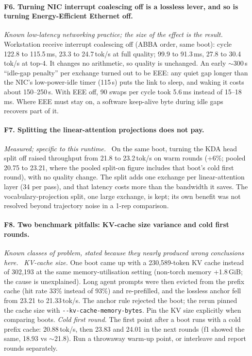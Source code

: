 \documentclass[11pt]{article}
\newcommand{\tps}{\,tok/s}
\newcommand{\ms}{\,ms}
\newcommand{\finding}[2]{\paragraph{#1}\emph{#2}\ }
\begin{document}
\finding{F6. Turning NIC interrupt coalescing off is a lossless lever, and so is turning Energy-Efficient Ethernet off.}{Known
low-latency networking practice; the size of the effect is the result.}
Workstation receive interrupt coalescing off (ABBA order, same boot): cycle 122.8 to 115.5\ms, 23.3 to 24.7\tps{} at
full quality; 99.9 to 91.3\ms, 27.8 to 30.4\tps{} at top-4. It changes no arithmetic, so quality is unchanged. An early
$\sim$300\,\textmu s ``idle-gap penalty'' per exchange turned out to be EEE: any quiet gap longer than the NIC's
low-power-idle timer (115\,\textmu s) puts the link to sleep, and waking it costs about 150--250\,\textmu s. With EEE
off, 90 swaps per cycle took 5.6\ms{} instead of 15--18\ms. Where EEE must stay on, a software keep-alive byte during
idle gaps recovers part of it.

\finding{F7. Splitting the linear-attention projections does not pay.}{Measured; specific to this runtime.}
On the same boot, turning the KDA head split off raised throughput from 21.8 to 23.2\tps{} on warm rounds (+6\%; pooled
20.75 to 23.21, where the pooled split-on figure includes that boot's cold first round), with no quality change. The split
adds one exchange per linear-attention layer (34 per pass), and that latency costs more than the bandwidth it saves. The
vocabulary-projection split, one large exchange, is kept; its own benefit was not resolved beyond trajectory noise in a
1-rep comparison.

\finding{F8. Two benchmark pitfalls: KV-cache size variance and cold first rounds.}{Known classes of problem, stated because
they nearly produced wrong conclusions here.}
\emph{KV-cache size.} One boot came up with a 230,589-token KV cache instead of 302,193 at the same memory-utilisation
setting (non-torch memory +1.8\,GiB; the cause is unexplained). Long agent prompts were then evicted from the prefix
cache (hit rate 33\% instead of 93\%) and re-prefilled, and the lossless anchor fell from 23.21 to 21.33\tps. The anchor
rule rejected the boot; the rerun pinned the cache size with \texttt{-{}-kv-cache-memory-bytes}. Pin the KV size
explicitly when comparing boots. \emph{Cold first round.} The first point after a boot runs with a cold prefix cache:
20.88\tps, then 23.83 and 24.01 in the next rounds (f1 showed the same, 18.93 vs $\sim$21.8). Run a throwaway warm-up
point, or interleave and report rounds separately.
\end{document}
